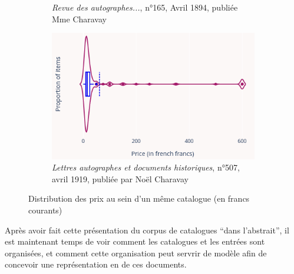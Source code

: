 \begin{figure}[p]
\begin{subfigure}{0.6\textwidth}
		\caption{\textit{Revue des autographes...}, n°165, Avril 1894, publiée Mme Charavay}
		\label{fig:rda165}
	\end{subfigure}
	\begin{subfigure}{0.6\textwidth}
		\includegraphics[width=\textwidth]{img/lad507_distrib.png}
		\caption{\textit{Lettres autographes et documents historiques}, n°507, avril 1919, publiée par Noël Charavay}
	\end{subfigure}
	\caption{Distribution des prix au sein d'un même catalogue (en francs courants)}
	\label{fig:violin}
\end{figure}

Après avoir fait cette présentation du corpus de catalogues \enquote{dans l'abstrait}, il est maintenant temps de voir comment les catalogues et les entrées sont organisées, et comment cette organisation peut servrir de modèle afin de concevoir une représentation en \xmltei{} de ces documents.


